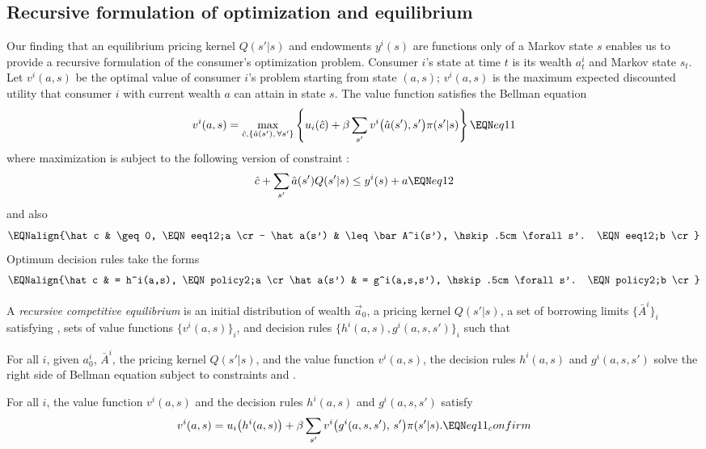 \subsection{Recursive formulation of optimization and equilibrium}
Our finding that an equilibrium  pricing kernel $Q(s'|s)$ and  endowments $y^i(s)$
are  functions only of a Markov state $s$ enables us to provide a
recursive formulation of the consumer's optimization problem.
Consumer $i$'s state at time $t$ is its wealth $a^i_t$ and Markov state $s_t$.
Let $v^i(a,s)$ be the optimal value of consumer $i$'s problem
starting from state $(a, s)$;     $v^i(a,s)$ is the maximum
expected discounted utility  that consumer $i$ with current wealth $a$
can attain in state $s$.
The value function satisfies the Bellman equation %
$$ v^i(a, s) = \max_{\hat c, \{\hat a(s'),\, \forall s'\}} 
\left\{ u_i(\hat c) + \beta
\sum_{s'} v^i\bigl(\hat a(s'),s'\bigr) 
                 \pi (s' | s) \right\} \EQN eq11 $$
where  maximization is subject to the following version
of constraint :
$$ \hat c + \sum_{s'} \hat a(s') Q(s' | s)
     \leq  y^i(s) + a  \EQN eq12   $$
and also
$$\EQNalign{\hat c & \geq 0, \EQN eeq12;a \cr
           -   \hat a(s') & \leq \bar A^i(s'), \hskip.5cm \forall s'.   \EQN eeq12;b \cr}$$
Optimum decision rules take the forms
$$\EQNalign{\hat c & =  h^i(a,s), \EQN policy2;a \cr
  \hat a(s') & = g^i(a,s,s'), \hskip.5cm \forall s'. 
                                  \EQN policy2;b \cr}$$


\medskip{} A {\it  recursive competitive equilibrium} is
an initial distribution of wealth $\vec a_0$, 
a pricing kernel $Q(s' | s)$, 
a set of borrowing limits $\{\bar A^i \}_i$
satisfying ,
sets of value functions $\{v^i(a,s)\}_i$, and
decision rules $\{h^i(a,s), g^i(a,s,s')\}_i$ such
that

\medskip
{} For all $i$, given
$a^i_0$, $\bar A^i$, the pricing kernel $Q(s' | s)$, and
the value function $v^i(a,s)$, the decision rules
$h^i(a,s)$ and $g^i(a,s,s')$ solve the right side
of Bellman equation  subject to constraints
 and .

\medskip
{} For all $i$, the value function
$v^i(a,s)$ and the decision rules
$h^i(a,s)$ and $g^i(a,s,s')$ satisfy
$$ v^i(a, s) = u_i\bigl(h^i(a,s)\bigr) + \beta
\sum_{s'} v^i\bigl(g^i(a,s,s'),\,s'\bigr) 
                 \pi (s' | s).  \EQN eq11_confirm $$

